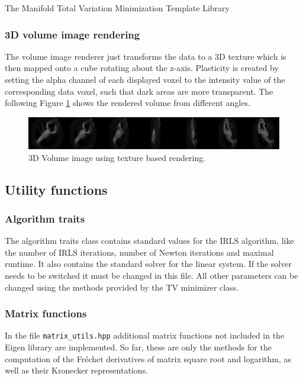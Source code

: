 \begin{chapter}{The Manifold Total Variation Minimization Template Library}
\FloatBarrier
\subsubsection{3D volume image rendering} %
\label{ssub:3D Volume image rendering}
The volume image renderer just transforms the data to a 3D texture which is then mapped onto a cube rotating about the z-axis.
Plasticity is created by setting the alpha channel of each displayed voxel to the intensity value of the corresponding data voxel, such that dark areas are more transparent.
The following Figure \ref{fig:volume_visualization} shows the rendered volume from different angles.
\begin{figure}[h!]
        \centering
	    \includegraphics[width=1.0\linewidth]{./figures/library/3dvol_seq.png}
	    \caption[3D Volume image renderer]{3D Volume image using texture based rendering. }
	\label{fig:volume_visualization}
\end{figure}


\subsection{Utility functions} %
\label{sub:Utility function}

\subsubsection{Algorithm traits} %
\label{ssub:AlgoTraits}
The algorithm traits class contains standard values for the IRLS algorithm, like the number of IRLS iterations, number of Newton iterations and maximal runtime.
It also contains the standard solver for the linear system. If the solver needs to be switched it must be changed in this file. All other parameters can
be changed using the methods provided by the TV minimizer class.


\subsubsection{Matrix functions} %
\label{ssub:Matrix functions}
In the file \texttt{matrix\_utils.hpp} additional matrix functions not included in the Eigen library are implemented.
So far, these are only the methods for the computation of the Fr\'{e}chet derivatives of matrix square root and logarithm, as well as their
Kronecker representations.


\end{chapter}
